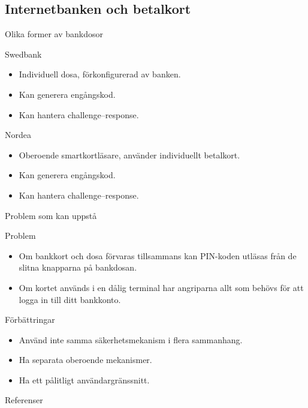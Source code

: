 \documentclass{beamer}
\theoremstyle{definition}
\theoremstyle{remark}
\begin{document}
\subsection{Internetbanken och betalkort}

\begin{frame}{Olika former av bankdosor}
  \begin{block}{Swedbank}
    \begin{itemize}
      \item Individuell dosa, förkonfigurerad av banken.
      \item Kan generera engångskod.
      \item Kan hantera challenge--response.
    \end{itemize}
  \end{block}

  \pause{}

  \begin{block}{Nordea}
    \begin{itemize}
      \item Oberoende smartkortläsare, använder individuellt betalkort.
      \item Kan generera engångskod.
      \item Kan hantera challenge--response.
    \end{itemize}
  \end{block}
\end{frame}

\begin{frame}{Problem som kan uppstå}
  \begin{block}{Problem}
    \begin{itemize}
      \item Om bankkort och dosa förvaras tillsammans kan PIN-koden utläsas 
        från de slitna knapparna på bankdosan.
      \item Om kortet används i en dålig terminal har angriparna allt som 
        behövs för att logga in till ditt bankkonto.
    \end{itemize}
  \end{block}

  \pause{}

  \begin{block}{Förbättringar}
    \begin{itemize}
      \item Använd inte samma säkerhetsmekanism i flera sammanhang.
      \item Ha separata oberoende mekanismer.
      \item Ha ett pålitligt användargränssnitt.
    \end{itemize}
  \end{block}
\end{frame}




\begin{frame}{Referenser}
	\small
  \printbibliography{}
\end{frame}
\end{document}

